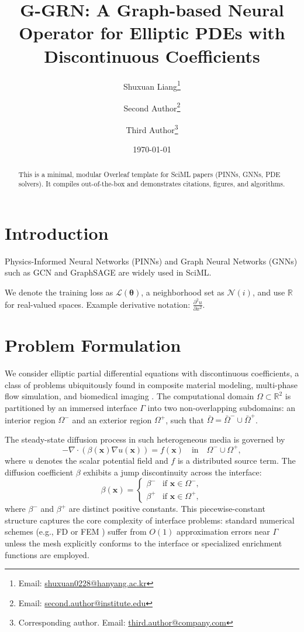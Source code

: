 \documentclass[11pt]{article}
\title{G-GRN: A Graph-based Neural Operator for Elliptic PDEs with Discontinuous Coefficients}
\author[1]{Shuxuan Liang\thanks{Email: \href{mailto:shuxuan0228@hanyang.ac.kr}{shuxuan0228@hanyang.ac.kr}}}
\author[2]{Second Author\thanks{Email: \href{mailto:second.author@institute.edu}{second.author@institute.edu}}}
\author[3]{Third Author\thanks{Corresponding author. Email: \href{mailto:third.author@company.com}{third.author@company.com}}}
\affil[1]{Department of Applied Mathematics, XXX University}
\affil[2]{Institute of Artificial Intelligence, YYY University}
\affil[3]{Research Lab, ZZZ Corporation}
\date{\today}
\theoremstyle{definition}
\theoremstyle{remark}
\theoremstyle{plain}
\newcommand{\mL}{\mathcal{L}}           %
\newcommand{\Ncal}{\mathcal{N}}        %
\newcommand{\R}{\mathbb{R}}            %
\newcommand{\pd}[3][]{%
  \frac{\partial^{#1} #2}{\partial #3^{#1}}%
}
\begin{document}
\maketitle

\begin{abstract}
This is a minimal, modular Overleaf template for SciML papers (PINNs, GNNs, PDE solvers).
It compiles out-of-the-box and demonstrates citations, figures, and algorithms.
\end{abstract}

\section{Introduction}
Physics-Informed Neural Networks (PINNs) \citep{raissi2019pinn} and Graph Neural Networks (GNNs) such as GCN \citep{kipf2017gcn} and GraphSAGE \citep{hamilton2017graphsage} are widely used in SciML.

We denote the training loss as $\mL(\bm{\theta})$, a neighborhood set as $\Ncal(i)$, and use $\R$ for real-valued spaces.
Example derivative notation: $\pd[2]{u}{x}$.

\section{Problem Formulation}

We consider elliptic partial differential equations with discontinuous coefficients, a class of problems ubiquitously found in composite material modeling, multi-phase flow simulation, and biomedical imaging \cite{leveque1994immersed, zhou2006fictitious}. The computational domain $\Omega \subset \mathbb{R}^2$ is partitioned by an immersed interface $\Gamma$ into two non-overlapping subdomains: an interior region $\Omega^-$ and an exterior region $\Omega^+$, such that $\bar{\Omega} = \bar{\Omega}^- \cup \bar{\Omega}^+$.

The steady-state diffusion process in such heterogeneous media is governed by
\begin{equation}
    -\nabla \cdot (\beta(\mathbf{x}) \nabla u(\mathbf{x})) = f(\mathbf{x}) \quad \text{in} \quad \Omega^- \cup \Omega^+,
\end{equation}
where $u$ denotes the scalar potential field and $f$ is a distributed source term. The diffusion coefficient $\beta$ exhibits a jump discontinuity across the interface:
\begin{equation}
    \beta(\mathbf{x}) =
    \begin{cases}
        \beta^- & \text{if } \mathbf{x} \in \Omega^-, \\
        \beta^+ & \text{if } \mathbf{x} \in \Omega^+,
    \end{cases}
\end{equation}
where $\beta^-$ and $\beta^+$ are distinct positive constants. This piecewise-constant structure captures the core complexity of interface problems: standard numerical schemes (e.g., FD \cite{liszka1980finite} or FEM \cite{babuvska1970finite}) suffer from $O(1)$ approximation errors near $\Gamma$ unless the mesh explicitly conforms to the interface or specialized enrichment functions are employed.
\end{document}
